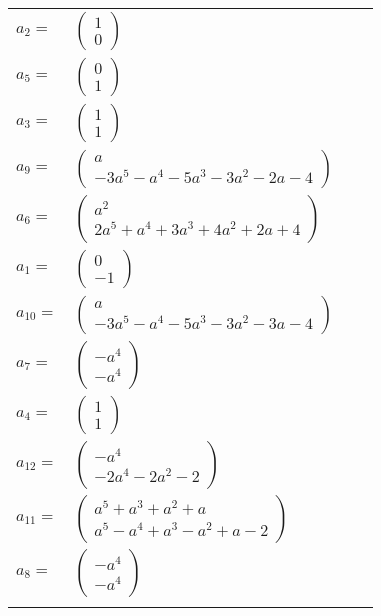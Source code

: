 \documentclass[1p]{elsarticle_modified}
\theoremstyle{definition}
\begin{document}
\begin{tabular}{m{7pt} m{180pt} m{7pt} m{180pt} }
\flushright $a_{2}=$&$\begin{pmatrix}1\\0\end{pmatrix}$ \\
\flushright $a_{5}=$&$\begin{pmatrix}0\\1\end{pmatrix}$ \\
\flushright $a_{3}=$&$\begin{pmatrix}1\\1\end{pmatrix}$ \\
\flushright $a_{9}=$&$\begin{pmatrix}a\\-3 a^5- a^4-5 a^3-3 a^2-2 a-4\end{pmatrix}$ \\
\flushright $a_{6}=$&$\begin{pmatrix}a^2\\2 a^5+a^4+3 a^3+4 a^2+2 a+4\end{pmatrix}$ \\
\flushright $a_{1}=$&$\begin{pmatrix}0\\-1\end{pmatrix}$ \\
\flushright $a_{10}=$&$\begin{pmatrix}a\\-3 a^5- a^4-5 a^3-3 a^2-3 a-4\end{pmatrix}$ \\
\flushright $a_{7}=$&$\begin{pmatrix}- a^4\\- a^4\end{pmatrix}$ \\
\flushright $a_{4}=$&$\begin{pmatrix}1\\1\end{pmatrix}$ \\
\flushright $a_{12}=$&$\begin{pmatrix}- a^4\\-2 a^4-2 a^2-2\end{pmatrix}$ \\
\flushright $a_{11}=$&$\begin{pmatrix}a^5+a^3+a^2+a\\a^5- a^4+a^3- a^2+a-2\end{pmatrix}$ \\
\flushright $a_{8}=$&$\begin{pmatrix}- a^4\\- a^4\end{pmatrix}$\\&\end{tabular}
\end{document}
